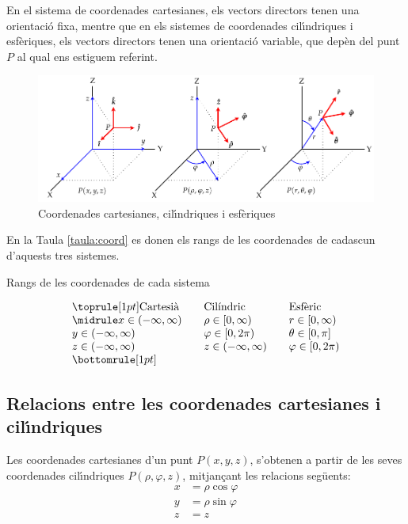 \documentclass[catalan,a4paper,twoside,11pt]{article}
\begin{document}
En el sistema de coordenades cartesianes, els vectors directors
tenen una orientaci\'{o} fixa, mentre que en els sistemes de
coordenades cil\'{\i}ndriques i esf\`{e}riques, els vectors
directors tenen una orientaci\'{o} variable, que dep\`{e}n del punt
$P$ al qual ens estiguem referint.

\begin{figure}[h]
\centering
   \includegraphics{Imatges/Coordenades.pdf}
\caption{Coordenades cartesianes, cil\'{\i}ndriques i esf\`{e}riques}
\label{pic:coord-cart-cil-esf}
\end{figure}

En la Taula \vref{taula:coord} es donen els rangs de les coordenades de cadascun d'aquests tres sistemes.
\begin{table}[htb]
   \caption{\label{taula:coord}Rangs de les coordenades de cada sistema}
   \[ \begin{array}{lllll}
   \toprule[1pt]
   \text{Cartesi\`{a}} &  & \text{Cil\'{\i}ndric} & & \text{Esf\`{e}ric}
   \\
   \midrule
      x\in(-\infty,\infty) &   & \rho\in[0,\infty)    &  &  r\in[0,\infty)  \\
      y\in(-\infty,\infty) &   & \varphi\in[0,2\pi)   &  &  \theta\in[0,\pi] \\
      z\in(-\infty,\infty) &   & z\in(-\infty,\infty) &  &  \varphi\in[0,2\pi) \\
   \bottomrule[1pt]
   \end{array}   \]
\end{table}

\subsection{Relacions entre les coordenades cartesianes i
cil\'{\i}ndriques}

Les coordenades cartesianes  d'un punt $P(x,y,z)$, s'obtenen a partir
de les seves coordenades cil\'{\i}ndriques $P(\rho,\varphi,z)$,
mitjan\c{c}ant les relacions seg\"{u}ents:
\begin{subequations}\begin{align}
    x &=\rho\cos\varphi \\ y &=\rho\sin\varphi \\ z &=z
\end{align}\end{subequations}
\end{document}
